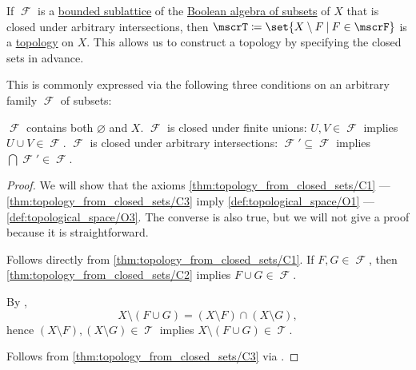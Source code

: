 \begin{proposition}\label{thm:topology_from_closed_sets}
  If \( \mscrF \) is a \hyperref[def:semilattice/submodel]{bounded sublattice} of the \hyperref[thm:boolean_algebra_of_subsets]{Boolean algebra of subsets} of \( X \) that is closed under arbitrary intersections, then \( \mscrT \coloneqq \set{ X \setminus F \given F \in \mscrF } \) is a \hyperref[def:topological_space]{topology} on \( X \). This allows us to construct a topology by specifying the closed sets in advance.

  This is commonly expressed via the following three conditions on an arbitrary family \( \mscrF \) of subsets:
  \begin{thmenum}
     \( \mscrF \) contains both \( \varnothing \) and \( X \).
     \( \mscrF \) is closed under finite unions: \( U, V \in \mscrF \) implies \( U \cup V \in \mscrF \).
     \( \mscrF \) is closed under arbitrary intersections: \( \mscrF' \subseteq \mscrF \) implies \( \bigcap \mscrF' \in \mscrF \).
  \end{thmenum}
\end{proposition}
\begin{proof}
  We will show that the axioms \ref{thm:topology_from_closed_sets/C1} --- \ref{thm:topology_from_closed_sets/C3} imply \ref{def:topological_space/O1} --- \ref{def:topological_space/O3}. The converse is also true, but we will not give a proof because it is straightforward.

   Follows directly from \ref{thm:topology_from_closed_sets/C1}.
   If \( F, G \in \mscrF \), then \ref{thm:topology_from_closed_sets/C2} implies \( F \cup G \in \mscrF \).

  By ,
  \begin{equation*}
    X \setminus (F \cup G) = (X \setminus F) \cap (X \setminus G),
  \end{equation*}
  hence \( (X \setminus F), (X \setminus G) \in \mscrT \) implies \( X \setminus (F \cup G) \in \mscrT \).

   Follows from \ref{thm:topology_from_closed_sets/C3} via .
\end{proof}

